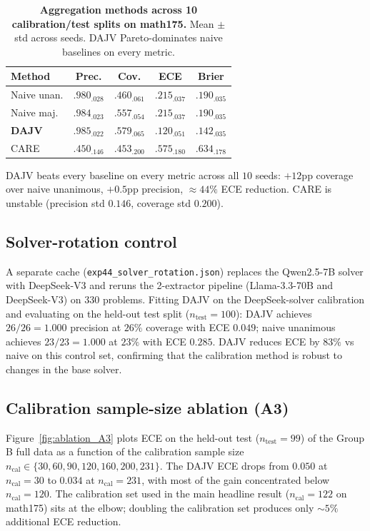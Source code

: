 \begin{table}[h]
\centering
\caption{\textbf{Aggregation methods across 10 calibration/test splits
on math175.} Mean $\pm$ std across seeds. DAJV Pareto-dominates naive
baselines on every metric.}
\label{tab:seed_stability_app}
\small
\setlength{\tabcolsep}{2.8pt}
\begin{tabular}{lcccc}
\toprule
Method & Prec. & Cov. & ECE & Brier \\
\midrule
Naive unan.   & $.980_{.028}$ & $.460_{.061}$ & $.215_{.037}$ & $.190_{.035}$ \\
Naive maj.    & $.984_{.023}$ & $.557_{.054}$ & $.215_{.037}$ & $.190_{.035}$ \\
\textbf{DAJV} & $\mathbf{.985_{.022}}$ & $\mathbf{.579_{.065}}$ & $\mathbf{.120_{.051}}$ & $\mathbf{.142_{.035}}$ \\
CARE          & $.450_{.146}$ & $.453_{.200}$ & $.575_{.180}$ & $.634_{.178}$ \\
\bottomrule
\end{tabular}
\end{table}

DAJV beats every baseline on every metric across all $10$ seeds:
$+12$pp coverage over naive unanimous, $+0.5$pp precision,
$\approx 44\%$ ECE reduction. CARE is unstable (precision std
$0.146$, coverage std $0.200$).

\subsection{Solver-rotation control}
\label{app:solver_rotation}

A separate cache (\texttt{exp44\_solver\_rotation.json}) replaces the
Qwen2.5-7B solver with DeepSeek-V3 and reruns the 2-extractor pipeline
(Llama-3.3-70B and DeepSeek-V3) on $330$ problems. Fitting DAJV on the
DeepSeek-solver calibration and evaluating on the held-out test split
($n_{\text{test}} = 100$): DAJV achieves $26/26 = 1.000$ precision at
$26\%$ coverage with ECE $0.049$; naive unanimous achieves
$23/23 = 1.000$ at $23\%$ with ECE $0.285$. DAJV reduces ECE by
$83\%$ vs naive on this control set, confirming that the calibration
method is robust to changes in the base solver.

\subsection{Calibration sample-size ablation (A3)}
\label{app:ablation_A3}

Figure~\ref{fig:ablation_A3} plots ECE on the held-out test
($n_{\text{test}} = 99$) of the Group B full data as a function of
the calibration sample size $n_{\text{cal}} \in \{30, 60, 90, 120,
160, 200, 231\}$. The DAJV ECE drops from $0.050$ at
$n_{\text{cal}} = 30$ to $0.034$ at $n_{\text{cal}} = 231$, with most
of the gain concentrated below $n_{\text{cal}} = 120$. The
calibration set used in the main headline result
($n_{\text{cal}} = 122$ on math175) sits at the elbow; doubling the
calibration set produces only $\sim 5\%$ additional ECE reduction.

